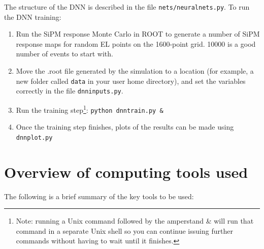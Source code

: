 \documentclass[10pt]{article}
\begin{document}
\noindent The structure of the DNN is described in the file \verb|nets/neuralnets.py|.  To run the DNN training:

\begin{enumerate}
	\item[1.] Run the SiPM response Monte Carlo in ROOT to generate a number of SiPM response maps for random EL points on the 1600-point grid.  10000 is a good number of events to start with.
	\item[2.] Move the .root file generated by the simulation to a location (for example, a new folder called \verb|data| in your user home directory), and set the variables correctly in the file
	\verb|dnninputs.py|.
	\item[3.] Run the training step\footnote{Note: running a Unix command followed by the amperstand \& will run that command in a separate Unix shell so you can continue issuing further commands without having to wait until it finishes.}: \verb|python dnntrain.py &|
	\item[4.] Once the training step finishes, plots of the results can be made using \verb|dnnplot.py|
\end{enumerate}

\appendix
\section{Overview of computing tools used}\label{ss_computingtools}
\noindent The following is a brief summary of the key tools to be used:
\end{document}
